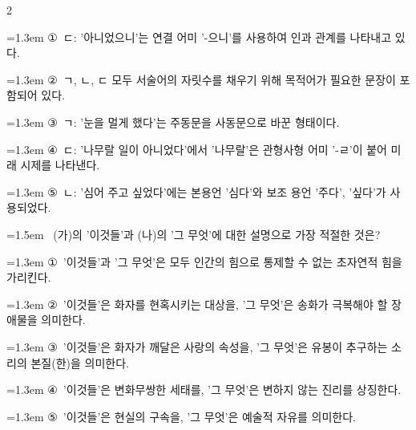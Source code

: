 \documentclass[10pt, a4paper]{article}
\begin{document}
\begin{multicols}{2}
\begin{minipage}{\columnwidth}
\vspace{0.5mm}
{\hangindent=1.3em  \noindent\hspace{0.3em}①~ㄷ: '아니었으니'는 연결 어미 '-으니'를 사용하여 인과 관계를 나타내고 있다.\par}
{\hangindent=1.3em  \noindent\hspace{0.3em}②~ㄱ, ㄴ, ㄷ 모두 서술어의 자릿수를 채우기 위해 목적어가 필요한 문장이 포함되어 있다.\par}
{\hangindent=1.3em  \noindent\hspace{0.3em}③~ㄱ: '눈을 멀게 했다'는 주동문을 사동문으로 바꾼 형태이다.\par}
{\hangindent=1.3em  \noindent\hspace{0.3em}④~ㄷ: '나무랄 일이 아니었다'에서 '나무랄'은 관형사형 어미 '-ㄹ'이 붙어 미래 시제를 나타낸다.\par}
{\hangindent=1.3em  \noindent\hspace{0.3em}⑤~ㄴ: '심어 주고 싶었다'에는 본용언 '심다'와 보조 용언 '주다', '싶다'가 사용되었다.\par}
\vspace{4mm}
\end{minipage}
\par

\noindent\begin{minipage}{\columnwidth}
\vspace{2mm}
{\hangindent=1.5em  ~(가)의 '이것들'과 (나)의 '그 무엇'에 대한 설명으로 가장 적절한 것은?\par}

\vspace{0.5mm}
{\hangindent=1.3em  \noindent\hspace{0.3em}①~'이것들'과 '그 무엇'은 모두 인간의 힘으로 통제할 수 없는 초자연적 힘을 가리킨다.\par}
{\hangindent=1.3em  \noindent\hspace{0.3em}②~'이것들'은 화자를 현혹시키는 대상을, '그 무엇'은 송화가 극복해야 할 장애물을 의미한다.\par}
{\hangindent=1.3em  \noindent\hspace{0.3em}③~'이것들'은 화자가 깨달은 사랑의 속성을, '그 무엇'은 유봉이 추구하는 소리의 본질(한)을 의미한다.\par}
{\hangindent=1.3em  \noindent\hspace{0.3em}④~'이것들'은 변화무쌍한 세태를, '그 무엇'은 변하지 않는 진리를 상징한다.\par}
{\hangindent=1.3em  \noindent\hspace{0.3em}⑤~'이것들'은 현실의 구속을, '그 무엇'은 예술적 자유를 의미한다.\par}
\vspace{4mm}
\end{minipage}
\par


\end{multicols}
\end{document}
